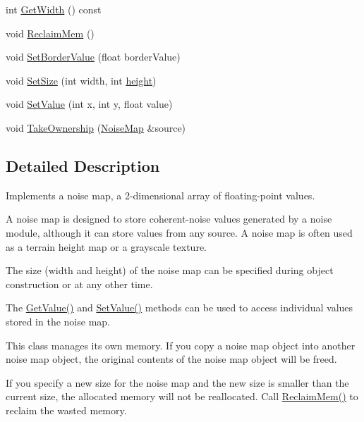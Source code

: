 \begin{DoxyCompactItemize}
\item 
int \hyperlink{classnoise_1_1utils_1_1_noise_map_a8355dbe703d6c46c8bbe34112fcd172d}{Get\+Width} () const 
\item 
void \hyperlink{classnoise_1_1utils_1_1_noise_map_a8b70547d93cbf309386921cc633be985}{Reclaim\+Mem} ()
\item 
void \hyperlink{classnoise_1_1utils_1_1_noise_map_a1f315013b6efbb015c32399029641701}{Set\+Border\+Value} (float border\+Value)
\item 
void \hyperlink{classnoise_1_1utils_1_1_noise_map_a34d636a9867038308278823acf44d719}{Set\+Size} (int width, int \hyperlink{_examples_2_bezier_2_app_8cpp_a48083b65ac9a863566dc3e3fff09a5b4}{height})
\item 
void \hyperlink{classnoise_1_1utils_1_1_noise_map_a872648e1f57eec601da63770371e342f}{Set\+Value} (int x, int y, float value)
\item 
void \hyperlink{classnoise_1_1utils_1_1_noise_map_a317303932238da988696a57ed4a31427}{Take\+Ownership} (\hyperlink{classnoise_1_1utils_1_1_noise_map}{Noise\+Map} \&source)
\end{DoxyCompactItemize}


\subsection{Detailed Description}
Implements a noise map, a 2-\/dimensional array of floating-\/point values.

A noise map is designed to store coherent-\/noise values generated by a noise module, although it can store values from any source. A noise map is often used as a terrain height map or a grayscale texture.

The size (width and height) of the noise map can be specified during object construction or at any other time.

The \hyperlink{classnoise_1_1utils_1_1_noise_map_ac7a52997dc3115bcdb09d235b40e49a8}{Get\+Value()} and \hyperlink{classnoise_1_1utils_1_1_noise_map_a3a19cede9cb4cb3161be13517f03b4e6}{Set\+Value()} methods can be used to access individual values stored in the noise map.

This class manages its own memory. If you copy a noise map object into another noise map object, the original contents of the noise map object will be freed.

If you specify a new size for the noise map and the new size is smaller than the current size, the allocated memory will not be reallocated. Call \hyperlink{classnoise_1_1utils_1_1_noise_map_aa525ef83cc80c8d257a515a43e5f614e}{Reclaim\+Mem()} to reclaim the wasted memory.


